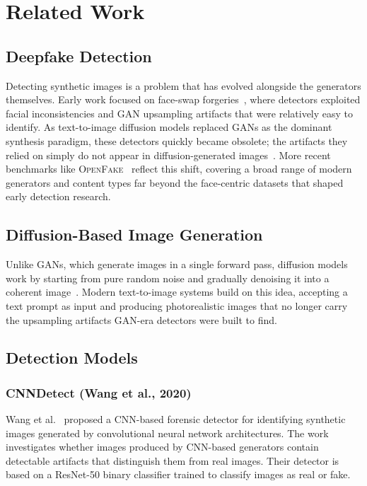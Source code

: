 \section{Related Work}
\label{sec:related-work}

\subsection{Deepfake Detection}
\label{subsec:deepfake-detection}

Detecting synthetic images is a problem that has evolved alongside the generators themselves. Early work focused on face-swap forgeries~\cite{rossler2019faceforensics, perov2020deepfacelab}, where detectors exploited facial inconsistencies and GAN upsampling artifacts that were relatively easy to identify. As text-to-image diffusion models replaced GANs as the dominant synthesis paradigm, these detectors quickly became obsolete; the artifacts they relied on simply do not appear in diffusion-generated images~\cite{ojha2023universal}. More recent benchmarks like \textsc{OpenFake}~\cite{livernoche2025openfake} reflect this shift, covering a broad range of modern generators and content types far beyond the face-centric datasets that shaped early detection research.

\subsection{Diffusion-Based Image Generation}
\label{subsec:diffusion-generation}

Unlike GANs, which generate images in a single forward pass, diffusion models work by starting from pure random noise and gradually denoising it into a coherent image~\cite{ho2020ddpm}. Modern text-to-image systems build on this idea, accepting a text prompt as input and producing photorealistic images that no longer carry the upsampling artifacts GAN-era detectors were built to find.


\subsection{Detection Models}
\label{subsec:detection-models}

\subsubsection{CNNDetect (Wang et al., 2020)}
\label{subsubsec:cnndetect}
Wang et al.~\cite{wang2020cnndetect} proposed a CNN-based forensic detector for identifying synthetic images generated by convolutional neural network architectures. The work investigates whether images produced by CNN-based generators contain detectable artifacts that distinguish them from real images. Their detector is based on a ResNet-50 binary classifier trained to classify images as real or fake.

